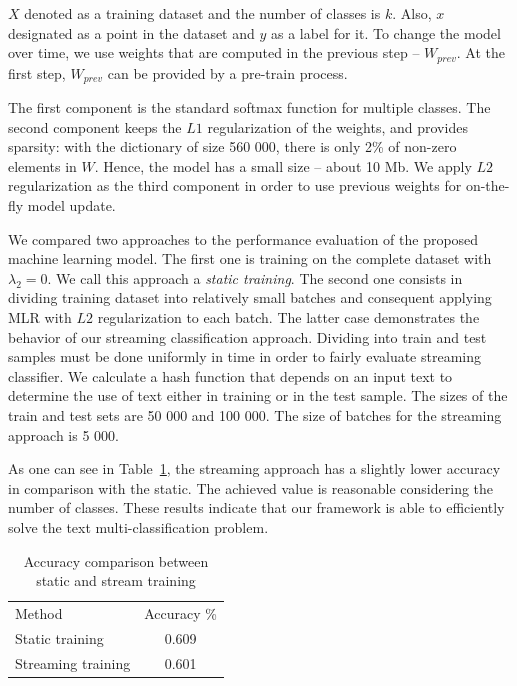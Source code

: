 $X$ denoted as a training dataset and the number of classes is $k$. Also, $x$ designated as a point in the dataset and $y$ as a label for it. To change the model over time, we use weights that are computed in the previous step -- $W_{prev}$. At the first step, $W_{prev}$ can be provided by a pre-train process.

The first component is the standard softmax function for multiple classes. The second component keeps the $L1$ regularization of the weights, and provides sparsity: with the dictionary of size 560 000, there is only 2\% of non-zero elements in $W$. Hence, the model has a small size -- about 10 Mb. We apply $L2$ regularization as the third component in order to use previous weights for on-the-fly model update.

We compared two approaches to the performance evaluation of the proposed machine learning model. The first one is training on the complete dataset with $\lambda_2 = 0$. We call this approach a {\em static training}. The second one consists in dividing training dataset into relatively small batches and consequent applying MLR with $L2$ regularization to each batch. The latter case demonstrates the behavior of our streaming classification approach. Dividing into train and test samples must be done uniformly in time in order to fairly evaluate streaming classifier. We calculate a hash function that depends on an input text to determine the use of text either in training or in the test sample. The sizes of the train and test sets are 50 000 and 100 000. The size of batches for the streaming approach is 5 000.

As one can see in Table~\ref{accuracy}, the streaming approach has a slightly lower accuracy in comparison with the static. The achieved value is reasonable considering the number of classes. These results indicate that our framework is able to efficiently solve the text multi-classification problem.

\begin{table}[htbp]
\caption{Accuracy comparison between static and stream training}
\begin{tabular}{lc}
Method             & Accuracy \% \\
Static training    & 0.609       \\
Streaming training & 0.601         
\end{tabular}
\label{accuracy}
\vspace{-7mm}
\end{table}
